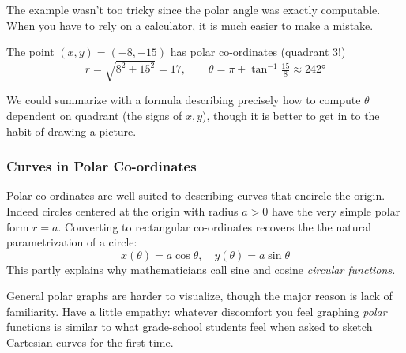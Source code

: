 The example wasn't too tricky since the polar angle was exactly computable. When you have to rely on a calculator, it is much easier to make a mistake.

\begin{example}{}{}
	The point $(x,y)=(-8,-15)$ has polar co-ordinates (quadrant 3!)
	\[
		r=\sqrt{8^2+15^2}=17,\qquad 
		\theta=\pi+\tan^{-1}\tfrac{15}8 \approx \ang{242}
	\]
\end{example}


We could summarize with a formula describing precisely how to compute $\theta$ dependent on quadrant (the signs of $x,y$), though it is better to get in to the habit of drawing a picture.




\subsubsection*{Curves in Polar Co-ordinates}

Polar co-ordinates are well-suited to describing curves that encircle the origin. Indeed circles centered at the origin with radius $a>0$ have the very simple polar form $r=a$. Converting to rectangular co-ordinates recovers the the natural parametrization of a circle:
\[
	x(\theta)=a\cos\theta,\quad 
	y(\theta)=a\sin\theta
\]
This partly explains why mathematicians call sine and cosine \emph{circular functions.}\smallbreak

General polar graphs are harder to visualize, though the major reason is lack of familiarity. Have a little empathy: whatever discomfort you feel graphing \emph{polar} functions is similar to what grade-school students feel when asked to sketch Cartesian curves for the first time.

